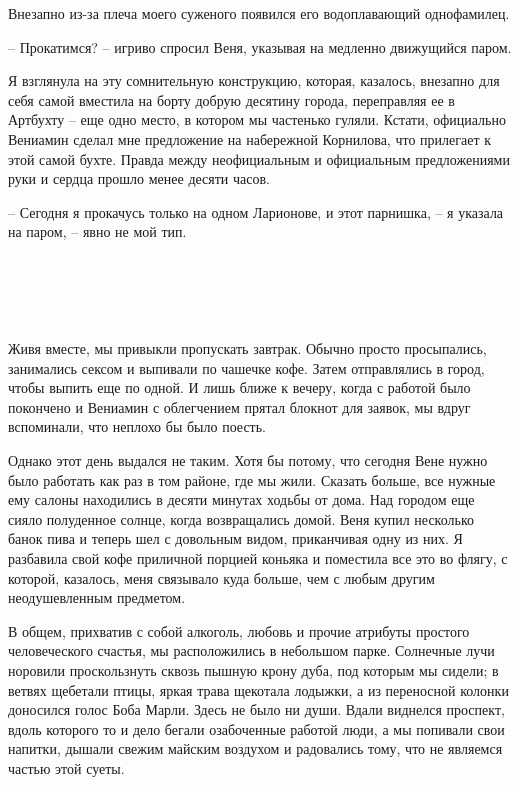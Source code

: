 \documentclass[
]{book}
\begin{document}
Внезапно из-за плеча моего суженого появился его водоплавающий однофамилец.

-- Прокатимся? -- игриво спросил Веня, указывая на медленно движущийся паром.

Я взглянула на эту сомнительную конструкцию, которая, казалось, внезапно для себя самой вместила на борту добрую десятину города, переправляя ее в Артбухту -- еще одно место, в котором мы частенько гуляли. Кстати, официально Вениамин сделал мне предложение на набережной Корнилова, что прилегает к этой самой бухте. Правда между неофициальным и официальным предложениями руки и сердца прошло менее десяти часов.

-- Сегодня я прокачусь только на одном Ларионове, и этот парнишка, -- я указала на паром, -- явно не мой тип.

\hypertarget{chapter-17}{%
\chapter{~}\label{chapter-17}}

Живя вместе, мы привыкли пропускать завтрак. Обычно просто просыпались, занимались сексом и выпивали по чашечке кофе. Затем отправлялись в город, чтобы выпить еще по одной. И лишь ближе к вечеру, когда с работой было покончено и Вениамин с облегчением прятал блокнот для заявок, мы вдруг вспоминали, что неплохо бы было поесть.

Однако этот день выдался не таким. Хотя бы потому, что сегодня Вене нужно было работать как раз в том районе, где мы жили. Сказать больше, все нужные ему салоны находились в десяти минутах ходьбы от дома. Над городом еще сияло полуденное солнце, когда возвращались домой. Веня купил несколько банок пива и теперь шел с довольным видом, приканчивая одну из них. Я разбавила свой кофе приличной порцией коньяка и поместила все это во флягу, с которой, казалось, меня связывало куда больше, чем с любым другим неодушевленным предметом.

В общем, прихватив с собой алкоголь, любовь и прочие атрибуты простого человеческого счастья, мы расположились в небольшом парке. Солнечные лучи норовили проскользнуть сквозь пышную крону дуба, под которым мы сидели; в ветвях щебетали птицы, яркая трава щекотала лодыжки, а из переносной колонки доносился голос Боба Марли. Здесь не было ни души. Вдали виднелся проспект, вдоль которого то и дело бегали озабоченные работой люди, а мы попивали свои напитки, дышали свежим майским воздухом и радовались тому, что не являемся частью этой суеты.
\end{document}

